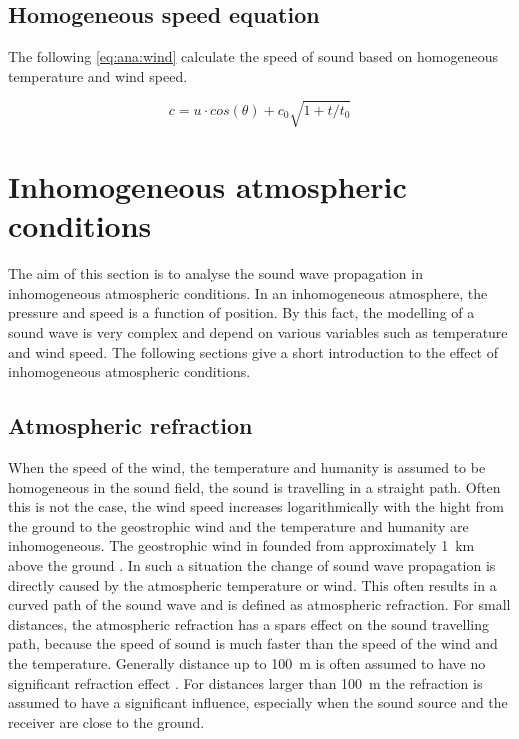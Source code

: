  
 \subsection{Homogeneous speed equation}\label{sec:ana:inhom_ats_con}
 The following \autoref{eq:ana:wind} calculate the speed of sound based on homogeneous temperature and wind speed.

\begin{equation}\label{eq:ana:wind}
c = u \cdot cos(\theta) + c_0 \sqrt{1+t/t_0}
\end{equation}  

\startexplain
{}
\stopexplain


 
\section{Inhomogeneous atmospheric conditions} 
The aim of this section is to analyse the sound wave propagation in inhomogeneous atmospheric conditions. In an inhomogeneous atmosphere, the pressure and speed is a function of position. By this fact, the modelling of a sound wave is very complex and depend on various variables such as temperature and wind speed. The following sections give a short introduction to the effect of inhomogeneous atmospheric conditions. 
 
 
\subsection{Atmospheric refraction}
When the speed of the wind, the temperature and humanity is assumed to be homogeneous in the sound field, the sound is travelling in a straight path. Often this is not the case, the wind speed increases logarithmically with the hight from the ground to the geostrophic wind \citep{asmos_acous_2016} and the temperature and humanity are inhomogeneous. The geostrophic wind in founded from approximately \SI{1}{\kilo\meter} above the ground \citep{geostrophic_wind}.  In such a situation the change of sound wave propagation is directly caused by the atmospheric temperature or wind. This often results in a curved path of the sound wave and is defined as atmospheric refraction. For small distances, the atmospheric refraction has a spars effect on the sound travelling path, because the speed of sound is much faster than the speed of the wind and the temperature. Generally distance up to \SI{100}{\meter} is often assumed to have no significant refraction effect \citep{effect_of_wind}. For distances larger than \SI{100}{\meter} the refraction is assumed to have a significant influence, especially when the sound source and the receiver are close to the ground.  


